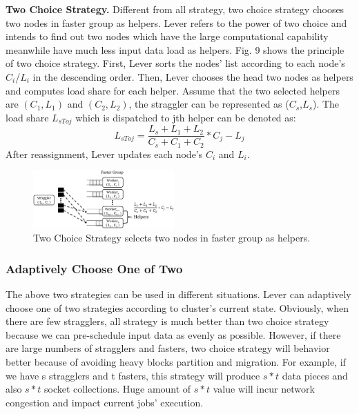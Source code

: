   \textbf{Two Choice Strategy.} Different from all strategy, two choice strategy chooses two nodes in faster group as helpers. Lever refers to the power of two choice\cite{Mitzenmacher1996} and intends to find out two nodes which have the large computational capability meanwhile have much less input data load as helpers. Fig. 9 shows the principle of two choice strategy. First, Lever sorts the nodes' list according to each node's \emph{$C_i$}/\emph{$L_i$} in the descending order. Then, Lever chooses the head two nodes as helpers and computes load share for each helper. Assume that the two selected helpers are $(C_1, L_1)$ and $(C_2, L_2)$, the straggler can be represented as (\emph{$C_s$},\emph{$L_s$}). The load share \emph{{$L_{sToj}$}} which is dispatched to jth helper can be denoted as:
  \begin{equation}
  L_{sToj} = \frac{L_s + L_1 + L_2}{C_s + C_1 + C_2}*C_j - L_j
  \end{equation}
  After reassignment, Lever updates each node's $C_i$ and $L_i$.
  \begin{figure}[htbp]
    \centering
    \includegraphics[width=0.48\textwidth]{FigureS2}
    \caption{Two Choice Strategy selects two nodes in faster group as helpers.}
    \label{Fig. 9:}
  \end{figure}

\subsubsection{Adaptively Choose One of Two}

  The above two strategies can be used in different situations. Lever can adaptively choose one of two strategies according to cluster's current state. Obviously, when there are few stragglers, all strategy is much better than two choice strategy because we can pre-schedule input data as evenly as possible. However, if there are large numbers of stragglers and fasters, two choice strategy will behavior better because of avoiding heavy blocks partition and migration. For example, if we have s stragglers and t fasters, this strategy will produce $s*t$ data pieces and also $s*t$ socket collections. Huge amount of $s*t$ value will incur network congestion and impact current jobs' execution.

